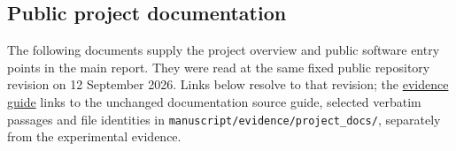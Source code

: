 \subsection[Public project documentation]{\texorpdfstring{\protect\hypertarget{e3}{}Public project documentation}{Public project documentation}}
The following documents supply the project overview and public software entry points in the main report. They were read at the same fixed public repository revision on 12 September 2026. Links below resolve to that revision; the \href{EVIDENCE_GUIDE.pdf\#public-docs}{evidence guide} links to the unchanged documentation source guide, selected verbatim passages and file identities in \nolinkurl{manuscript/evidence/project_docs/}, separately from the experimental evidence.

\begingroup\small\setlength{\tabcolsep}{3pt}\renewcommand{\arraystretch}{1.14}
